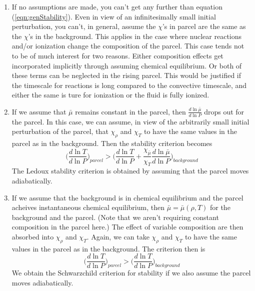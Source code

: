 \begin{enumerate}
\item
If no assumptions are made, you can't get any further than equation 
(\ref{eqn:genStability}).  Even in view of an infinitesimally small initial 
perturbation, you can't, in general, assume the $\chi$'s in parcel are the same 
as the $\chi$'s in the background.  
This applies in the case where nuclear reactions and/or ionization change the 
composition of the parcel.  This case tends not to be of much interest for
two reasons.  Either composition effects get incorporated implicitly through 
assuming chemical equilibrium.  Or both of these terms can be neglected in the 
rising parcel.  This would be justified if the timescale for reactions 
is long compared 
to the convective timescale, and either the same is ture for ionization or the 
fluid is fully ionized. 
\item
If we assume that $\bar{\mu}$ remains constant in the parcel, then 
$\frac{d \ln \bar{\mu}}{d \ln P}$ drops out for the parcel.  In this case,
we can assume, in view of the arbitrarily small initial perturbation of 
the parcel, that $\chi_\rho$ and $\chi_T$ to have the same values in the 
parcel as in the background.  Then the stability criterion becomes
\begin{equation}
  \bigg (  \frac{d \ln T}{d \ln P} \bigg )_{parcel} > 
  \bigg (  \frac{d \ln T}{d \ln P} + \frac{\chi_{\bar{\mu}}}{\chi_T}
  \frac{d \ln \bar{\mu}}{d \ln P} \bigg )_{background}
\label{eqn:Ledoux}
\end{equation}
The Ledoux stability criterion is obtained by assuming that the parcel moves
adiabatically.
\item
If we assume   
that the background is in chemical equilibrium and the parcel acheives 
instantaneous chemical equilibrium, then $\bar{\mu} = \bar{\mu}(\rho,T)$ for
the background and the parcel.  (Note that we aren't requiring constant 
composition in the parcel here.)
The effect of variable composition are then absorbed into $\chi_\rho$ and 
$\chi_T$.  Again, we can take $\chi_\rho$ and $\chi_T$ to have the same values 
in the parcel as in the background. The criterion then is 
\begin{equation}
\bigg ( \frac{d \ln T}{d \ln P} \bigg )_{parcel} > 
  \bigg ( \frac{d \ln T}{d \ln P} \bigg )_{background}
\label{eqn:Schwarz}
\end{equation}
We obtain the Schwarzchild criterion for 
stability if we also assume the parcel moves adiabatically.


\end{enumerate}
